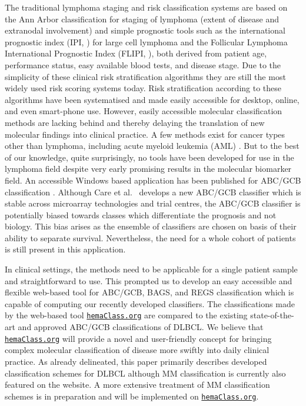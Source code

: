 \documentclass[twocolumn]{bmcart}%
\newcommand{\hemaClass}{\href{http://hemaClass.org}{\texttt{hemaClass.org}}}
\begin{document}
The traditional lymphoma staging and risk classification systems are based on the Ann Arbor classification for staging of lymphoma (extent of disease and extranodal involvement) and simple prognostic tools such as the international prognostic index (IPI, \cite{IPI}) for large cell lymphoma and the Follicular Lymphoma International Prognostic Index (FLIPI, \cite{FLIPI}), both derived from patient age, performance status, easy available blood tests, and disease stage.
Due to the simplicity of these clinical risk stratification algorithms they are still the most widely used risk scoring systems today.
Risk stratification according to these algorithms have been systematised and made easily accessible for desktop, online, and even smart-phone use.
However, easily accessible molecular classification methods are lacking behind and thereby delaying the translation of new molecular findings into clinical practice.
A few methods exist for cancer types other than lymphoma, including acute myeloid leukemia (AML) \cite{Huang2009}.
But to the best of our knowledge, quite surprisingly, no tools have been developed for use in the lymphoma field despite very early promising results in the molecular biomarker field.
An accessible Windows based application has been published for ABC/GCB classification \cite{Care2013}.
Although Care et al.~\cite{Care2013} develops a new ABC/GCB classifier which is stable across microarray technologies and trial centres, the ABC/GCB classifier is potentially biased towards classes which differentiate the prognosis and not biology.
This bias arises as the ensemble of classifiers are chosen on basis of their ability to separate survival.
Nevertheless, the need for a whole cohort of patients is still present in this application.

In clinical settings, the methods need to be applicable for a single patient sample and straightforward to use.
This prompted us to develop an easy accessible and flexible web-based tool for ABC/GCB, BAGS, and REGS classification which is capable of computing our recently developed classifiers.
The classifications made by the web-based tool \hemaClass{} are compared to the existing state-of-the-art and approved ABC/GCB classifications of DLBCL.
We believe that \hemaClass{} will provide a novel and user-friendly concept for bringing complex molecular classification of disease more swiftly into daily clinical practice.
As already delineated, this paper primarily describes developed classification schemes for DLBCL although MM classification is currently also featured on the website.
A more extensive treatment of MM classification schemes is in preparation and will be implemented on \hemaClass{}.
\end{document}
